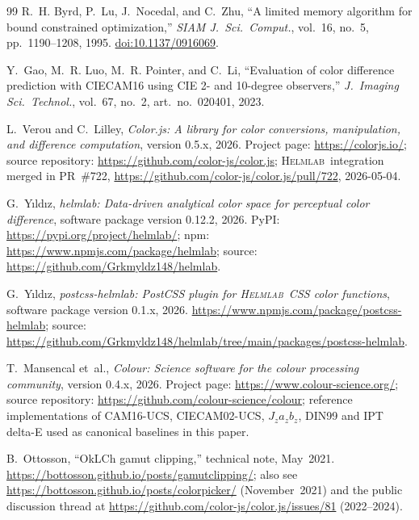 \documentclass[11pt, twocolumn]{article}
\newcommand{\helmlab}{\textsc{Helmlab}}
\begin{document}
\begin{thebibliography}{99}
R.~H. Byrd, P.~Lu, J.~Nocedal, and C.~Zhu, ``A limited memory
algorithm for bound constrained optimization,'' \textit{SIAM J.\ Sci.\
Comput.}, vol.~16, no.~5, pp.~1190--1208, 1995.
\href{https://doi.org/10.1137/0916069}{doi:10.1137/0916069}.

Y.~Gao, M.~R. Luo, M.~R. Pointer, and C.~Li, ``Evaluation of
color difference prediction with CIECAM16 using CIE 2- and 10-degree
observers,'' \textit{J.\ Imaging Sci.\ Technol.}, vol.~67, no.~2,
art.~no.~020401, 2023.

L.~Verou and C.~Lilley, \textit{Color.js: A library for color
conversions, manipulation, and difference computation}, version 0.5.x,
2026. Project page: \url{https://colorjs.io/}; source repository:
\url{https://github.com/color-js/color.js}; \helmlab\ integration
merged in PR~\#722,
\url{https://github.com/color-js/color.js/pull/722}, 2026-05-04.

G.~Y{\i}ld{\i}z, \textit{helmlab: Data-driven analytical color space
for perceptual color difference}, software package version 0.12.2,
2026.
PyPI: \url{https://pypi.org/project/helmlab/};
npm: \url{https://www.npmjs.com/package/helmlab};
source: \url{https://github.com/Grkmyldz148/helmlab}.

G.~Y{\i}ld{\i}z, \textit{postcss-helmlab: PostCSS plugin for
\helmlab\ CSS color functions}, software package version 0.1.x, 2026.
\url{https://www.npmjs.com/package/postcss-helmlab};
source: \url{https://github.com/Grkmyldz148/helmlab/tree/main/packages/postcss-helmlab}.

T.~Mansencal et~al., \textit{Colour: Science software for the colour
processing community}, version 0.4.x, 2026. Project page:
\url{https://www.colour-science.org/}; source repository:
\url{https://github.com/colour-science/colour}; reference implementations of CAM16-UCS,
CIECAM02-UCS, $J_z a_z b_z$, DIN99 and IPT delta-E used as canonical
baselines in this paper.

B.~Ottosson, ``OkLCh gamut clipping,'' technical note, May~2021.
\url{https://bottosson.github.io/posts/gamutclipping/};
also see \url{https://bottosson.github.io/posts/colorpicker/}
(November~2021) and the public discussion thread at
\url{https://github.com/color-js/color.js/issues/81} (2022--2024).

\end{thebibliography}


\appendix
\end{document}
